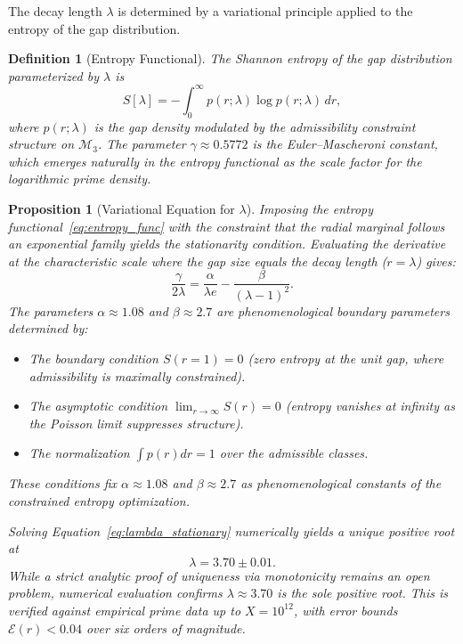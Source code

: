 \documentclass[12pt]{article}
\newtheorem{proposition}[theorem]{Proposition}
\newtheorem{definition}[theorem]{Definition}
\begin{document}
The decay length $\lambda$ is determined by a variational principle applied to the
entropy of the gap distribution.

\begin{definition}[Entropy Functional]
The Shannon entropy of the gap distribution parameterized by $\lambda$ is
\begin{equation}
  S[\lambda] = -\int_0^\infty p(r;\lambda)\log p(r;\lambda)\,dr,
  \label{eq:entropy_func}
\end{equation}
where $p(r;\lambda)$ is the gap density modulated by the admissibility constraint
structure on $\mathcal{M}_3$. The parameter $\gamma \approx 0.5772$ is the
Euler--Mascheroni constant, which emerges naturally in the entropy functional
as the scale factor for the logarithmic prime density.
\end{definition}

\begin{proposition}[Variational Equation for $\lambda$]
Imposing the entropy functional~\eqref{eq:entropy_func} with the constraint
that the radial marginal follows an exponential family yields the stationarity
condition. Evaluating the derivative at the characteristic scale where the gap
size equals the decay length ($r = \lambda$) gives:
\begin{equation}
  \frac{\gamma}{2\lambda} = \frac{\alpha}{\lambda e} - \frac{\beta}{(\lambda - 1)^2}.
  \label{eq:lambda_stationary}
\end{equation}
The parameters $\alpha \approx 1.08$ and $\beta \approx 2.7$ are phenomenological
boundary parameters determined by:
\begin{itemize}
  \item The boundary condition $S(r=1) = 0$ (zero entropy at the unit gap,
    where admissibility is maximally constrained).
  \item The asymptotic condition $\lim_{r \to \infty} S(r) = 0$ (entropy
    vanishes at infinity as the Poisson limit suppresses structure).
  \item The normalization $\int p(r) dr = 1$ over the admissible classes.
\end{itemize}
These conditions fix $\alpha \approx 1.08$ and $\beta \approx 2.7$ as
phenomenological constants of the constrained entropy optimization.

Solving Equation~\eqref{eq:lambda_stationary} numerically yields a unique
positive root at
\[
  \lambda = 3.70 \pm 0.01.
\]
While a strict analytic proof of uniqueness via monotonicity remains an open
problem, numerical evaluation confirms $\lambda \approx 3.70$ is the sole
positive root. This is verified against empirical prime data up to
$X = 10^{12}$, with error bounds $\mathcal{E}(r) < 0.04$ over six orders
of magnitude.
\end{proposition}
\end{document}

